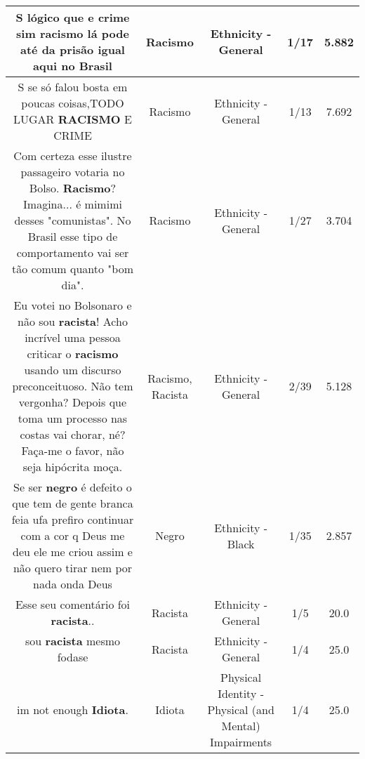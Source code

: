 \documentclass[11pt]{article}
\newlength\mylength
\begin{document}
\begin{center}
\begin{longtable}{|C{.65\mylength}|C{.30\mylength}|C{.12\mylength}|C{.12\mylength}|C{.12\mylength}|}
  \small {} S lógico que e crime sim \textbf{racismo} lá pode até da prisão igual aqui no Brasil\normalsize   & Racismo & Ethnicity - General & 1/17 & 5.882 \\  \hline
  \small {} S se só falou bosta em poucas coisas,TODO LUGAR \textbf{RACISMO} E CRIME\normalsize   & Racismo & Ethnicity - General & 1/13 & 7.692 \\  \hline
  \small Com certeza esse ilustre passageiro votaria no Bolso. \textbf{Racismo}? Imagina... é mimimi desses "comunistas". No Brasil esse tipo de comportamento vai ser tão comum quanto "bom dia".\normalsize   & Racismo & Ethnicity - General & 1/27 & 3.704 \\  \hline
  \small Eu votei no Bolsonaro e não sou \textbf{racista}! Acho incrível uma pessoa criticar o \textbf{racismo} usando um discurso preconceituoso. Não tem vergonha? Depois que toma um processo nas costas vai chorar, né? Faça-me o favor, não seja hipócrita moça.\normalsize   & Racismo, Racista & Ethnicity - General & 2/39 & 5.128 \\  \hline
  \small Se ser \textbf{negro} é defeito o que tem de gente branca feia ufa prefiro continuar com a cor q Deus me deu ele me criou assim e não quero tirar nem por nada onda Deus\normalsize   & Negro & Ethnicity - Black & 1/35 & 2.857 \\  \hline
  \small Esse seu comentário foi \textbf{racista}..\normalsize   & Racista & Ethnicity - General & 1/5 & 20.0 \\  \hline
  \small sou \textbf{racista} mesmo fodase\normalsize   & Racista & Ethnicity - General & 1/4 & 25.0 \\  \hline
  \small im not enough \textbf{Idiota}.\normalsize   & Idiota & Physical Identity - Physical (and Mental) Impairments & 1/4 & 25.0 \\  \hline

\end{longtable}
\end{center}
\end{document}
